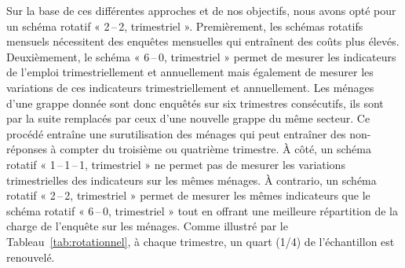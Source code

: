 \documentclass[12pt, a4paper]{article}
\begin{document}
Sur la base de ces différentes approches et de nos objectifs, nous avons opté pour un schéma rotatif « 2\,--\,2, trimestriel ». Premièrement, les schémas rotatifs mensuels nécessitent des enquêtes mensuelles qui entraînent des coûts plus élevés. Deuxièmement, le schéma « 6\,--\,0, trimestriel » permet de mesurer les indicateurs de l'emploi trimestriellement et annuellement mais également de mesurer les variations de ces indicateurs trimestriellement et annuellement. Les ménages d'une grappe donnée sont donc enquêtés sur six trimestres consécutifs, ils sont par la suite remplacés par ceux d'une nouvelle grappe du même secteur. Ce procédé entraîne une surutilisation des ménages qui peut entraîner des non-réponses à compter du troisième ou quatrième trimestre. À côté, un schéma rotatif « 1\,--\,1\,--\,1, trimestriel » ne permet pas de mesurer les variations trimestrielles des indicateurs sur les mêmes ménages. À contrario, un schéma rotatif « 2\,--\,2, trimestriel » permet de mesurer les mêmes indicateurs que le schéma rotatif « 6\,--\,0, trimestriel » tout en offrant une meilleure répartition de la charge de l'enquête sur les ménages. Comme illustré par le Tableau~\ref{tab:rotationnel}, à chaque trimestre, un quart (1/4) de l'échantillon est renouvelé.
\end{document}
